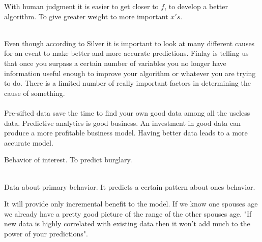 \documentclass[12pt]{article}
\begin{document}
\begin{enumerate}
With human judgment it is easier to get closer to $f$, to develop a better algorithm. To give greater weight to more important $x's$. 

\\
Even though according to Silver it is important to look at many different causes for an event to make better and more accurate predictions. Finlay is telling us that once you surpass a certain number of variables you no longer have information useful enough to improve your algorithm or whatever you are trying to do. There is a limited number of really important factors in determining the cause of something.\\

\\

Pre-sifted data save the time to find your own good data among all the useless data.
Predictive analytics is good business. An investment in good data can produce a more profitable business model. Having better data leads to a more accurate model.

Behavior of interest. To predict burglary.

\\
Data about primary behavior. It predicts a certain pattern about ones behavior.

It will provide only incremental benefit to the model. If we know one spouses age we already have a pretty good picture of the range of the other spouses age. "If new data is highly correlated with existing data then it won't add much to the power of your predictions".



\end{enumerate}
\end{document}
